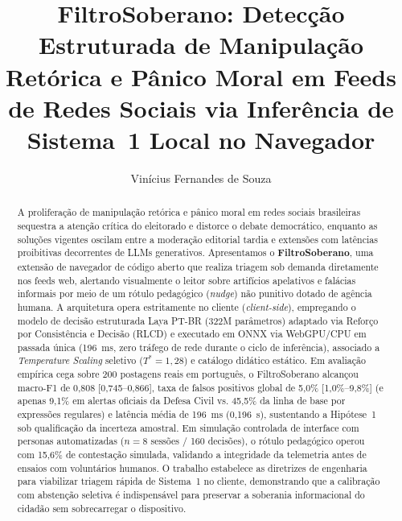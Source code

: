 \documentclass[runningheads]{llncs}
\begin{document}
\title{FiltroSoberano: Detecção Estruturada de Manipulação Retórica e Pânico Moral em Feeds de Redes Sociais via Inferência de Sistema~1 Local no Navegador}

\author{Vinícius Fernandes de Souza}


\maketitle

\begin{abstract}
A proliferação de manipulação retórica e pânico moral em redes sociais brasileiras sequestra a atenção crítica do eleitorado e distorce o debate democrático, enquanto as soluções vigentes oscilam entre a moderação editorial tardia e extensões com latências proibitivas decorrentes de LLMs generativos. Apresentamos o \textbf{FiltroSoberano}, uma extensão de navegador de código aberto que realiza triagem sob demanda diretamente nos feeds web, alertando visualmente o leitor sobre artifícios apelativos e falácias informais por meio de um rótulo pedagógico (\textit{nudge}) não punitivo dotado de agência humana. A arquitetura opera estritamente no cliente (\textit{client-side}), empregando o modelo de decisão estruturada Laya PT-BR (322M parâmetros) adaptado via Reforço por Consistência e Decisão (RLCD) e executado em ONNX via WebGPU/CPU em passada única (196~ms, zero tráfego de rede durante o ciclo de inferência), associado a \textit{Temperature Scaling} seletivo ($T^*=1{,}28$) e catálogo didático estático. Em avaliação empírica cega sobre 200 postagens reais em português, o FiltroSoberano alcançou macro-F1 de 0,808 [0,745--0,866], taxa de falsos positivos global de 5,0\% [1,0\%--9,8\%] (e apenas 9,1\% em alertas oficiais da Defesa Civil vs. 45,5\% da linha de base por expressões regulares) e latência média de 196~ms (0,196~s), sustentando a Hipótese~1 sob qualificação da incerteza amostral. Em simulação controlada de interface com personas automatizadas ($n=8$ sessões / 160 decisões), o rótulo pedagógico operou com 15,6\% de contestação simulada, validando a integridade da telemetria antes de ensaios com voluntários humanos. O trabalho estabelece as diretrizes de engenharia para viabilizar triagem rápida de Sistema~1 no cliente, demonstrando que a calibração com abstenção seletiva é indispensável para preservar a soberania informacional do cidadão sem sobrecarregar o dispositivo.

\end{abstract}
\end{document}
